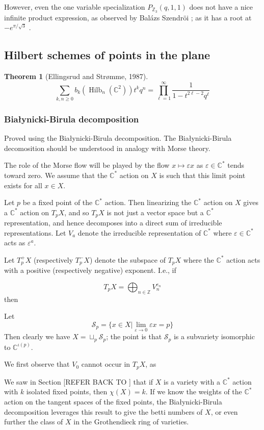 \documentclass{amsart}[12pt]
\theoremstyle{definition}
\newtheorem{theorem}[dummy]{Theorem}
\newcommand{\Z}{\mathbb{Z}}
\newcommand{\C}{\mathbb{C}}
\DeclareMathOperator{\Hilb}{Hilb}
\begin{document}
However, even the one variable specialization $P_{\Z_3}(q,1,1)$ does not have a nice infinite product expression, as observed by Bal\'azs Szendr\"oi \cite{Bmo}; as it has a root at $-e^{\pi/\sqrt{3}}$ \cite{Borwein2}.


\subsection{Hilbert schemes of points in the plane}


\begin{theorem}[Ellingsrud and Str\o mme, 1987]
$$\sum_{k,n \geq 0} b_k(\Hilb_n(\C^2))t^k q^n=\prod_{\ell=1}^\infty \frac{1}{1-t^{2\ell-2}q^\ell}$$
\end{theorem}



\subsubsection{Bia\l ynicki-Birula decomposition}
Proved using the Bia\l ynicki-Birula decomposition.  The Bia\l ynicki-Birula decomosition should be understood in analogy with Morse theory.  

The role of the Morse flow will be played by the flow $x\mapsto \varepsilon x$ as $\varepsilon\in\C^*$ tends toward zero.  We assume that the $\C^*$ action on $X$ is such that this limit point exists for all $x\in X$.  

Let $p$ be a fixed point of the $\C^*$ action.  Then linearizing the $\C^*$ action on $X$ gives a $\C^*$ action on $T_pX$, and so $T_pX$ is not just a vector space but a $\C^*$ representation, and hence decomposes into a direct sum of irreducible representations.  Let $V_a$ denote the irreducible representation of $\C^*$ where $\varepsilon\in\C^*$ acts as $\varepsilon^a$.  

Let $T_p^+X$ (respectively $T_p^-X$) denote the subspace of $T_pX$ where the $\C^*$ action acts with a positive (respectively negative) exponent.  I.e., if

$$T_pX=\bigoplus_{n\in\Z} V_n^{e_n}$$
then

Let 
$$\mathcal{S}_p=\{x\in X|\lim_{\varepsilon\to 0} \varepsilon x=p\}$$
Then clearly we have $X=\sqcup_{p}\mathcal{S}_p$; the point is that $\mathcal{S}_p$ is a subvariety isomorphic to $\C^{\iota(p)}$.



We first observe that $V_0$ cannot occur in $T_pX$, as 

We saw in Section [REFER BACK TO ] that if $X$ is a variety with a $\C^*$ action with $k$ isolated fixed points, then $\chi(X)=k$.  If we know the weights of the $\C^*$ action on the tangent spaces of the fixed points, the Bia\l ynicki-Birula decomposition leverages this result to give the betti numbers of $X$, or even further the class of $X$ in the Grothendieck ring of varieties.
\end{document}
